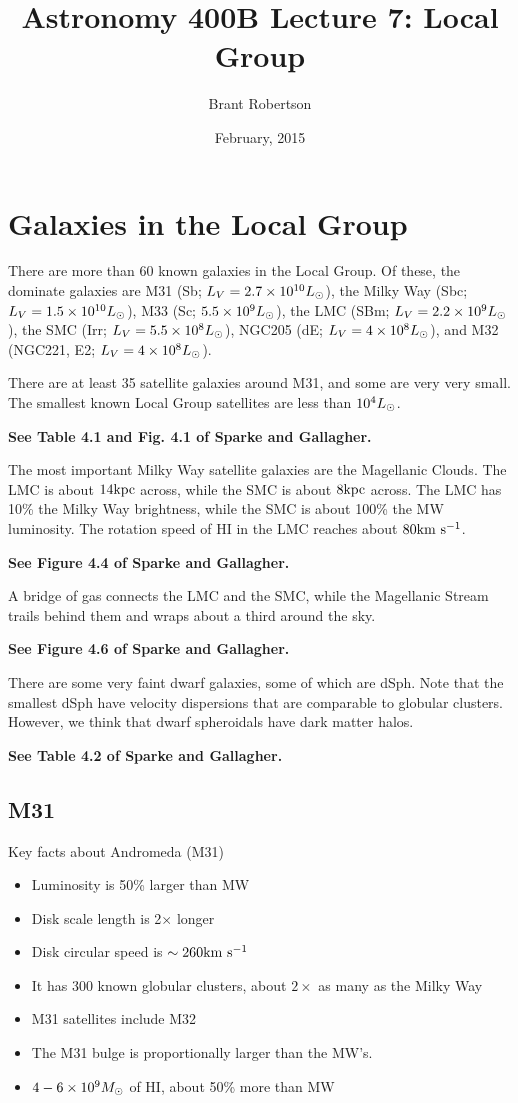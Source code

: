 \documentclass[]{article}
\title{Astronomy 400B Lecture 7: Local Group }
\author{Brant Robertson}
\date{February, 2015}
\begin{document}
\maketitle

\section{Galaxies in the Local Group}

There are more than 60 known galaxies in the
Local Group. Of these, the dominate
galaxies are M31 (Sb; $L_V=2.7\times10^{10}L_{\odot}$), 
the Milky Way (Sbc; $L_V=1.5\times10^{10}L_{\odot}$), 
M33 (Sc; $5.5\times10^9L_{\odot}$),
the LMC (SBm; $L_V=2.2\times10^9L_{\odot}$), 
the SMC (Irr; $L_V=5.5\times10^8L_{\odot}$), 
NGC205 (dE; $L_V=4\times10^8L_{\odot}$), and M32 (NGC221, E2; $L_V = 4\times10^8L_{\odot}$).

There are at least 35 satellite galaxies around M31, and some are
very very small.
The smallest known Local Group satellites are less than $10^4L_{\odot}$.

{\bf See Table 4.1 and Fig. 4.1 of Sparke and Gallagher.}

The most important Milky Way satellite galaxies are the
Magellanic Clouds.  The LMC is about $14\mathrm{kpc}$ across,
while the SMC is about $8\mathrm{kpc}$ across.  The LMC has
10\% the Milky Way brightness, while the SMC is about
100\% the MW luminosity.  The rotation speed of 
HI in the LMC reaches about $80\mathrm{km}~\mathrm{s}^{-1}$.

{\bf See Figure 4.4 of Sparke and Gallagher.}

A bridge of gas connects the LMC and the SMC, while
the Magellanic Stream trails behind them and wraps
about a third around the sky.

{\bf See Figure 4.6 of Sparke and Gallagher.}

There are some very faint dwarf galaxies, some of 
which are dSph.  Note that the smallest dSph have
velocity dispersions that are comparable to globular
clusters.  However, we think that dwarf spheroidals
have dark matter halos.

{\bf See Table 4.2 of Sparke and Gallagher.}

\subsection{M31}

Key facts about Andromeda (M31) 
\begin{itemize}
\item Luminosity is 50\% larger than MW
\item Disk scale length is 2$\times$ longer
\item Disk circular speed is $\sim260\mathrm{km}~\mathrm{s}^{-1}$
\item It has 300 known globular clusters, about $2\times$ as many as the Milky Way
\item M31 satellites include M32
\item The M31 bulge is proportionally larger than the MW's.
\item $4-6\times10^9M_{\odot}$ of HI, about 50\% more than MW
\end{itemize}
\end{document}
